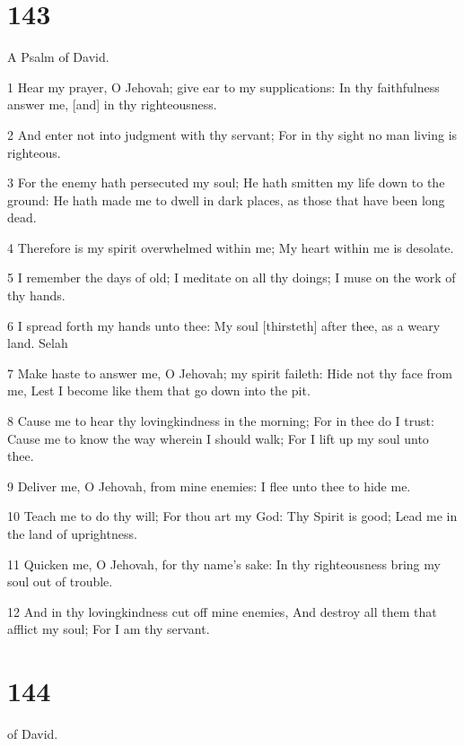 \chapter{143}

\par A Psalm of David.

\par 1 Hear my prayer, O Jehovah; give ear to my supplications: In thy faithfulness answer me, [and] in thy righteousness.
\par 2 And enter not into judgment with thy servant; For in thy sight no man living is righteous.
\par 3 For the enemy hath persecuted my soul; He hath smitten my life down to the ground: He hath made me to dwell in dark places, as those that have been long dead.
\par 4 Therefore is my spirit overwhelmed within me; My heart within me is desolate.
\par 5 I remember the days of old; I meditate on all thy doings; I muse on the work of thy hands.
\par 6 I spread forth my hands unto thee: My soul [thirsteth] after thee, as a weary land. Selah
\par 7 Make haste to answer me, O Jehovah; my spirit faileth: Hide not thy face from me, Lest I become like them that go down into the pit.
\par 8 Cause me to hear thy lovingkindness in the morning; For in thee do I trust: Cause me to know the way wherein I should walk; For I lift up my soul unto thee.
\par 9 Deliver me, O Jehovah, from mine enemies: I flee unto thee to hide me.
\par 10 Teach me to do thy will; For thou art my God: Thy Spirit is good; Lead me in the land of uprightness.
\par 11 Quicken me, O Jehovah, for thy name's sake: In thy righteousness bring my soul out of trouble.
\par 12 And in thy lovingkindness cut off mine enemies, And destroy all them that afflict my soul; For I am thy servant.

\chapter{144}

\par [A Psalm] of David.

